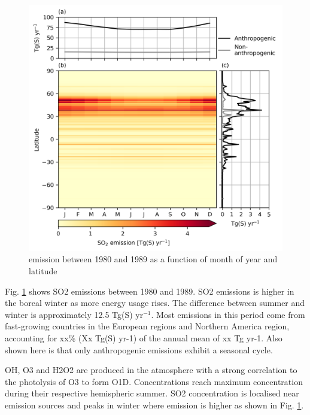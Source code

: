 \begin{figure}
    \centering
    \includegraphics{Chapter4/Figs/emiso2_monthly_1980.png}
    \caption{ emission between 1980 and 1989 as a function of month of year and latitude}
    \label{fig:ch4:seasonal-emission}
\end{figure}

Fig. \ref{fig:ch4:seasonal-emission} shows SO2 emissions between 1980 and 1989. SO2 emissions is higher in the boreal winter as more energy usage rises. The difference between summer and winter is approximately 12.5 Tg(S) yr$^{-1}$. Most emissions in this period come from fast-growing countries in the European regions and Northern America region, accounting for xx\% (Xx Tg(S) yr-1) of the annual mean of xx Tg yr-1. Also shown here is that only anthropogenic emissions exhibit a seasonal cycle.

OH, O3 and H2O2 are produced in the atmosphere with a strong correlation to the photolysis of O3 to form O1D. Concentrations reach maximum concentration during their respective hemispheric summer. SO2 concentration is localised near emission sources and peaks in winter where emission is higher as shown in Fig. \ref{fig:ch4:seasonal-emission}.

